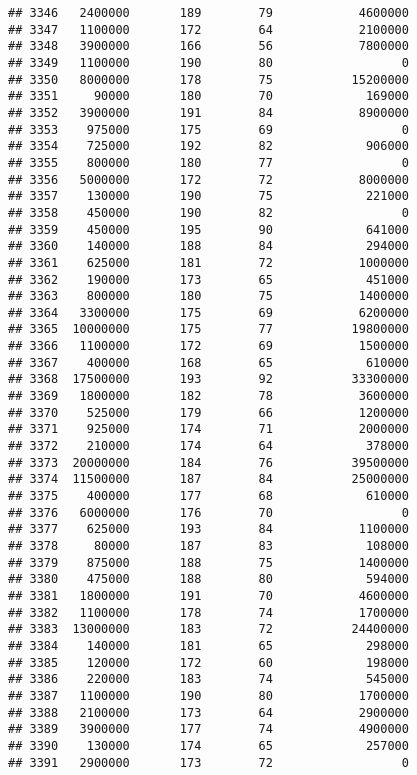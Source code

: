 \documentclass[
]{article}
\begin{document}
\begin{verbatim}
## 3346   2400000       189        79            4600000
## 3347   1100000       172        64            2100000
## 3348   3900000       166        56            7800000
## 3349   1100000       190        80                  0
## 3350   8000000       178        75           15200000
## 3351     90000       180        70             169000
## 3352   3900000       191        84            8900000
## 3353    975000       175        69                  0
## 3354    725000       192        82             906000
## 3355    800000       180        77                  0
## 3356   5000000       172        72            8000000
## 3357    130000       190        75             221000
## 3358    450000       190        82                  0
## 3359    450000       195        90             641000
## 3360    140000       188        84             294000
## 3361    625000       181        72            1000000
## 3362    190000       173        65             451000
## 3363    800000       180        75            1400000
## 3364   3300000       175        69            6200000
## 3365  10000000       175        77           19800000
## 3366   1100000       172        69            1500000
## 3367    400000       168        65             610000
## 3368  17500000       193        92           33300000
## 3369   1800000       182        78            3600000
## 3370    525000       179        66            1200000
## 3371    925000       174        71            2000000
## 3372    210000       174        64             378000
## 3373  20000000       184        76           39500000
## 3374  11500000       187        84           25000000
## 3375    400000       177        68             610000
## 3376   6000000       176        70                  0
## 3377    625000       193        84            1100000
## 3378     80000       187        83             108000
## 3379    875000       188        75            1400000
## 3380    475000       188        80             594000
## 3381   1800000       191        70            4600000
## 3382   1100000       178        74            1700000
## 3383  13000000       183        72           24400000
## 3384    140000       181        65             298000
## 3385    120000       172        60             198000
## 3386    220000       183        74             545000
## 3387   1100000       190        80            1700000
## 3388   2100000       173        64            2900000
## 3389   3900000       177        74            4900000
## 3390    130000       174        65             257000
## 3391   2900000       173        72                  0

\end{verbatim}
\end{document}
